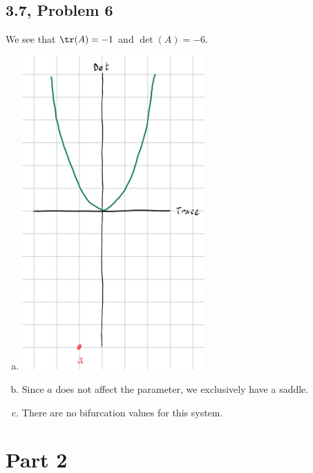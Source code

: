 \documentclass[10pt]{mypackage}
\begin{document}
\subsection{3.7, Problem 6}%
We see that $\tr(A) = -1$ and $\det(A) = -6$.
\begin{enumerate}[(a)]
  \item \hfill
    \begin{center}
      \includegraphics[width=7cm]{images/3_7_6a}
    \end{center}
  \item Since $a$ does not affect the parameter, we exclusively have a saddle.
  \item There are no bifurcation values for this system.
\end{enumerate}
\section{Part 2}%
\end{document}
